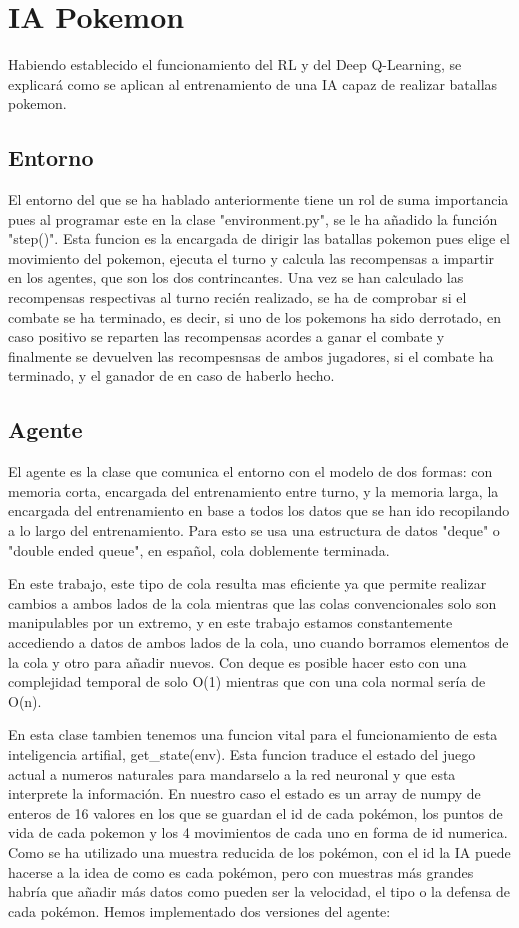 \chapter{IA Pokemon}

Habiendo establecido el funcionamiento del RL y del Deep Q-Learning, se explicará como se aplican al entrenamiento de una IA capaz de realizar batallas pokemon.

\section{Entorno}

El entorno del que se ha hablado anteriormente tiene un rol de suma importancia pues al programar este en la clase "environment.py", se le ha añadido la función "step()". Esta funcion es la encargada de dirigir las batallas pokemon pues elige el movimiento del pokemon, ejecuta el turno y calcula las recompensas a impartir en los agentes, que son los dos contrincantes. Una vez se han calculado las recompensas respectivas al turno recién realizado, se ha de comprobar si el combate se ha terminado, es decir, si uno de los pokemons ha sido derrotado, en caso positivo se reparten las recompensas acordes a ganar el combate y finalmente se devuelven las recompesnsas de ambos jugadores, si el combate ha terminado, y el ganador de en caso de haberlo hecho.

\section{Agente}

El agente es la clase que comunica el entorno con el modelo de dos formas: con memoria corta, encargada del entrenamiento entre turno, y la memoria larga, la encargada del entrenamiento en base a todos los datos que se han ido recopilando a lo largo del entrenamiento. Para esto se usa una estructura de datos "deque" o "double ended queue", en español, cola doblemente terminada.

En este trabajo, este tipo de cola resulta mas eficiente ya que permite realizar cambios a ambos lados de la cola mientras que las colas convencionales solo son manipulables por un extremo, y en este trabajo estamos constantemente accediendo a datos de ambos lados de la cola, uno cuando borramos elementos de la cola y otro para añadir nuevos. Con deque es posible hacer esto con una complejidad temporal de solo O(1) mientras que con una cola normal sería de O(n).

En esta clase tambien tenemos una funcion vital para el funcionamiento de esta inteligencia artifial, get_state(env). Esta funcion traduce el estado del juego actual a numeros naturales para mandarselo a la red neuronal y que esta interprete la información. En nuestro caso el estado es un array de numpy de enteros de 16 valores en los que se guardan el id de cada pokémon, los puntos de vida de cada pokemon y los 4 movimientos de cada uno en forma de id numerica. Como se ha utilizado una muestra reducida de los pokémon, con el id la IA puede hacerse a la idea de como es cada pokémon, pero con muestras más grandes habría que añadir más datos como pueden ser la velocidad, el tipo o la defensa de cada pokémon. Hemos implementado dos versiones del agente:

